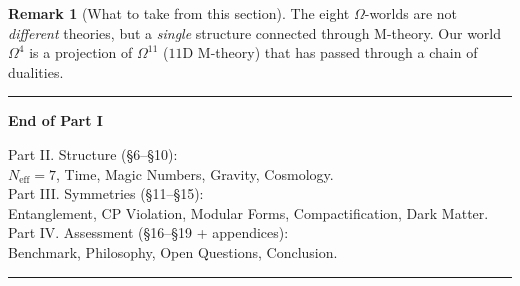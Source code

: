 \documentclass[11pt,a4paper]{article}
\newcommand{\Om}{\Omega^4}
\newcommand{\Ome}{\Omega^{11}}
\newcommand{\Neff}{N_{\text{eff}}}
\theoremstyle{definition}
\newtheorem{remark}[theorem]{Remark}
\begin{document}
\begin{remark}[What to take from this section]
\label{rem:mtheory-takeaway}
The eight $\Omega$-worlds are not \emph{different} theories, but 
a \emph{single} structure connected through M-theory. Our world 
$\Om$ is a projection of $\Ome$ ($11$D M-theory) that has passed through 
a chain of dualities.
\end{remark}


\vfill

\begin{center}
\rule{0.6\textwidth}{0.4pt}

\vspace{0.5cm}

{\large\bfseries End of Part I}

\vspace{0.3cm}

{\small
Part II. Structure (§6–§10): \\
$\Neff = 7$, Time, Magic Numbers, Gravity, Cosmology. \\
Part III. Symmetries (§11–§15): \\
Entanglement, CP Violation, Modular Forms, Compactification, 
Dark Matter. \\
Part IV. Assessment (§16–§19 + appendices): \\
Benchmark, Philosophy, Open Questions, Conclusion.
}

\vspace{0.5cm}

\rule{0.6\textwidth}{0.4pt}
\end{center}



\vspace{1cm}
\end{document}
